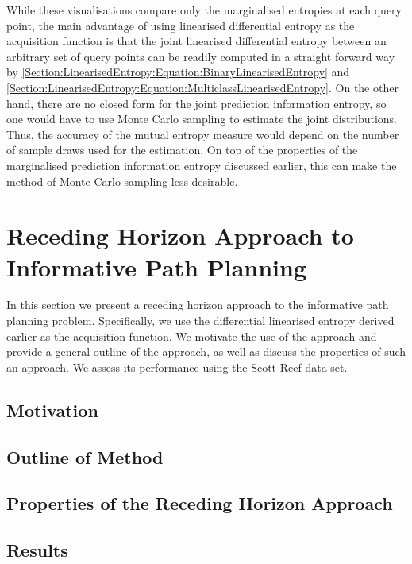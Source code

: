 \documentclass{article}
\begin{document}
			While these visualisations compare only the marginalised entropies at each query point, the main advantage of using linearised differential entropy as the acquisition function is that the joint linearised differential entropy between an arbitrary set of query points can be readily computed in a straight forward way by \eqref{Section:LinearisedEntropy:Equation:BinaryLinearisedEntropy} and \eqref{Section:LinearisedEntropy:Equation:MulticlassLinearisedEntropy}. On the other hand, there are no closed form for the joint prediction information entropy, so one would have to use Monte Carlo sampling to estimate the joint distributions. Thus, the accuracy of the mutual entropy measure would depend on the number of sample draws used for the estimation. On top of the properties of the marginalised prediction information entropy discussed earlier, this can make the method of Monte Carlo sampling less desirable.
					
\section{Receding Horizon Approach to Informative Path Planning}
\label{Section:RecedingHorizonApproach}

	In this section we present a receding horizon approach to the informative path planning problem. Specifically, we use the differential linearised entropy derived earlier as the acquisition function. We motivate the use of the approach and provide a general outline of the approach, as well as discuss the properties of such an approach. We assess its performance using the Scott Reef data set.
	
	\subsection{Motivation}
	
	\subsection{Outline of Method}
	
	\subsection{Properties of the Receding Horizon Approach}
	
	\subsection{Results}
	
\end{document}

